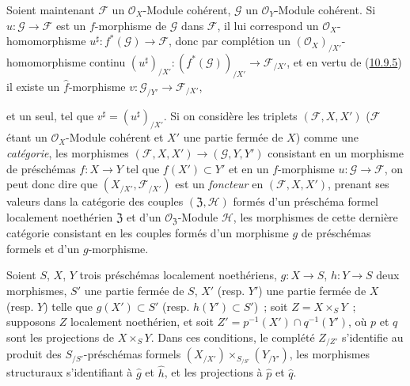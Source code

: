 \begin{env}[10.9.6]
\label{I.10.9.6-fr}
Soient maintenant $\mathscr{F}$ un $\mathscr{O}_X$-Module cohérent,
$\mathscr{G}$ un $\mathscr{O}_Y$-Module cohérent. Si
$u:\mathscr{G}\to\mathscr{F}$ est un $f$-morphisme de $\mathscr{G}$ dans
$\mathscr{F}$, il lui correspond un $\mathscr{O}_X$-homomorphisme
$u^\sharp:f^*(\mathscr{G})\to\mathscr{F}$, donc par complétion un
$(\mathscr{O}_X)_{/X'}$-homomorphisme continu
$(u^\sharp)_{/X'}:(f^*(\mathscr{G}))_{/X'}\to\mathscr{F}_{/X'}$, et en
vertu de (\hyperref[I.10.9.5-fr]{10.9.5}) il existe un
$\widehat f$-morphisme $v:\mathscr{G}_{/Y'}\to\mathscr{F}_{/X'}$,

et un seul, tel que $v^\sharp=(u^\sharp)_{/X'}$. Si on considère les
triplets $(\mathscr{F},X,X')$ ($\mathscr{F}$ étant un
$\mathscr{O}_X$-Module cohérent et $X'$ une partie fermée de $X$) comme
une \emph{catégorie}, les morphismes
$(\mathscr{F},X,X')\to(\mathscr{G},Y,Y')$ consistant en un morphisme de
préschémas $f:X\to Y$ tel que $f(X')\subset Y'$ et en un
$f$-morphisme $u:\mathscr{G}\to\mathscr{F}$, on peut donc dire que
$(X_{/X'},\mathscr{F}_{/X'})$ est un \emph{foncteur} en
$(\mathscr{F},X,X')$, prenant ses valeurs dans la catégorie des couples
$(\mathfrak{Z},\mathscr{H})$ formés d'un préschéma formel localement
noethérien $\mathfrak{Z}$ et d'un
$\mathscr{O}_{\mathfrak{Z}}$-Module $\mathscr{H}$, les morphismes de
cette dernière catégorie consistant en les couples formés d'un morphisme
$g$ de préschémas formels et d'un $g$-morphisme.
\end{env}

\begin{proposition}[10.9.7]
\label{I.10.9.7-fr}
Soient $S$, $X$, $Y$ trois préschémas localement noethériens,
$g:X\to S$, $h:Y\to S$ deux morphismes, $S'$ une partie fermée de $S$,
$X'$ (resp. $Y'$) une partie fermée de $X$ (resp. $Y$) telle que
$g(X')\subset S'$ (resp. $h(Y')\subset S'$)~; soit
$Z=X\times_S Y$~; supposons $Z$ localement noethérien, et soit
$Z'=p^{-1}(X')\cap q^{-1}(Y')$, où $p$ et $q$ sont les projections de
$X\times_S Y$. Dans ces conditions, le complété $Z_{/Z'}$ s'identifie au
produit des $S_{/S'}$-préschémas formels
$(X_{/X'})\times_{S_{/S'}}(Y_{/Y'})$, les morphismes structuraux
s'identifiant à $\widehat g$ et $\widehat h$, et les projections à
$\widehat p$ et $\widehat q$.
\end{proposition}

